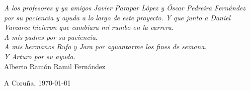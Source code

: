
{\it
 A los profesores y ya amigos Javier Parapar López y Óscar Pedreira Fernández por su paciencia y ayuda a lo largo de este proyecto. Y que junto a Daniel Varcarce hicieron que cambiara mi rumbo en la carrera.\\
A mis padres por su paciencia.\\
A mis hermanos Rufo y Jara por aguantarme los fines de semana.\\
Y Arturo por su ayuda.
}
\\ 

\normalfont
\vspace{1cm}
\hfill{Alberto Ramón Ramil Fernández}

\hfill{A Coruña, \today}